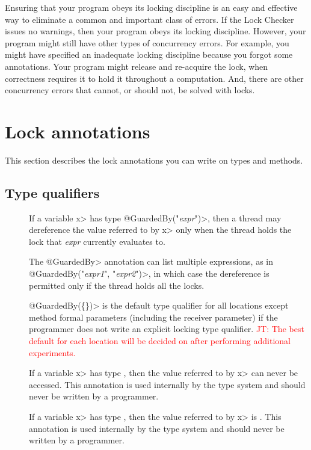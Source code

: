 Ensuring that your program obeys its locking discipline is an easy and
effective way to eliminate a common and important class of errors.
If the Lock Checker issues no warnings, then your program obeys its locking discipline.
However, your program might still have other types of concurrency errors.
%
For example, you might have specified an inadequate locking discipline
because you forgot some 
annotations.
%
Your program might release and
re-acquire the lock, when correctness requires it to hold it throughout a
computation.
%
And, there are other concurrency errors that cannot, or
should not, be solved with locks.


\section{Lock annotations\label{lock-annotations}}

This section describes the lock annotations you can write on types and methods.


\subsection{Type qualifiers\label{lock-type-qualifiers}}

\begin{description}

\item[]
  If a variable \<x> has type \<@GuardedBy("\emph{expr}")>, then a thread may
  dereference the value referred to by \<x> only when the thread holds the
  lock that \emph{expr} currently evaluates to.

  The \<@GuardedBy> annotation can list multiple expressions, as in
  \<@GuardedBy(\ttlcb"\emph{expr1}", "\emph{expr2}"\ttrcb)>, in which case
  the dereference is
  permitted only if the thread holds all the locks.

  \<@GuardedBy(\{\})> is the default type qualifier for all locations
  except method formal parameters (including the receiver parameter)
  if the programmer does not
  write an explicit locking type qualifier.
  \textcolor{red}{JT: The best default for each location will be decided on after performing
  additional experiments.}

\item[]
  If a variable \<x> has type , then
  the value referred to by \<x> can never be accessed.
  This annotation is used internally by the type system
  and should never be written by a programmer.

\item[]
  If a variable \<x> has type , then
  the value referred to by \<x> is .
  This annotation is used internally by the type system
  and should never be written by a programmer.

\end{description}


